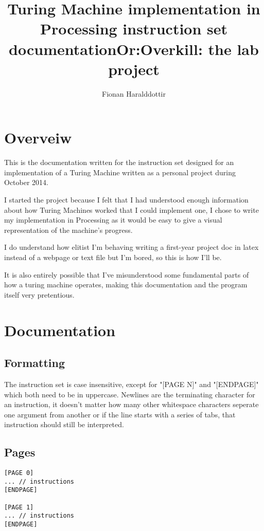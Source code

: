 \documentclass[11pt]{article}
\title{Turing Machine implementation in Processing instruction set documentation\linebreak Or:\linebreak Overkill: the lab project}
\author{Fionan Haralddottir}
\begin{document}
\maketitle

\section*{Overveiw}

This is the documentation written for the instruction set designed for an implementation of a Turing Machine written as a personal project during October 2014.

I started the project because I felt that I had understood enough information about how Turing Machines worked that I could implement one, I chose to write my implementation in Processing as it would be easy to give a visual representation of the machine's progress.

I do understand how elitist I'm behaving writing a first-year project doc in latex instead of a webpage or text file but I'm bored, so this is how I'll be.

It is also entirely possible that I've misunderstood some fundamental parts of how a turing machine operates, making this documentation and the program itself very pretentious.

\section{Documentation}

\subsection{Formatting}

The instruction set is case insensitive, except for "[PAGE N]" and "[ENDPAGE]" which both need to be in uppercase.\linebreak
Newlines are the terminating character for an instruction, it doesn't matter how many other whitespace characters seperate one argument from another or if the line starts with a series of tabs, that instruction should still be interpreted.\linebreak

\subsection{Pages}
\begin{lstlisting}
[PAGE 0]
... // instructions
[ENDPAGE]

[PAGE 1]
... // instructions
[ENDPAGE]
\end{lstlisting}
\end{document}
